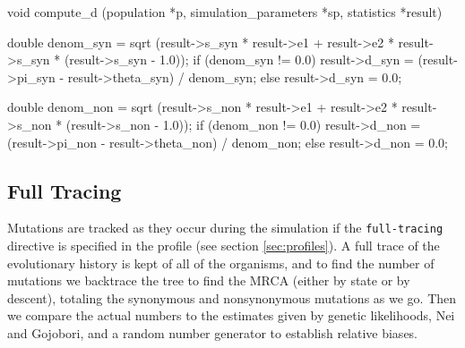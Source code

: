 \documentclass{article}
\begin{document}
\begin{ccode}
void compute_d (population *p, simulation_parameters *sp, statistics *result) {
  double denom_syn = sqrt (result->s_syn * result->e1 + result->e2 * result->s_syn *
							(result->s_syn - 1.0));
  if (denom_syn != 0.0)
    result->d_syn = (result->pi_syn - result->theta_syn) / denom_syn;
  else
    result->d_syn = 0.0;

  double denom_non = sqrt (result->s_non * result->e1 + result->e2 * result->s_non *
							(result->s_non - 1.0));
  if (denom_non != 0.0)
    result->d_non = (result->pi_non - result->theta_non) / denom_non;
  else
    result->d_non = 0.0;
}
\end{ccode}

    \subsection{Full Tracing}
      \label{sec:full-tracing}

      Mutations are tracked as they occur during the simulation if the
      \verb|full-tracing| directive is specified in the profile (see section
	  \ref{sec:profiles}). A full trace of the evolutionary history is
      kept of all of the organisms, and to find the number of mutations we
      backtrace the tree to find the MRCA (either by state or by descent),
      totaling the synonymous and nonsynonymous mutations as we go. Then we
      compare the actual numbers to the estimates given by genetic likelihoods,
      Nei and Gojobori, and a random number generator to establish relative
      biases.
\end{document}
